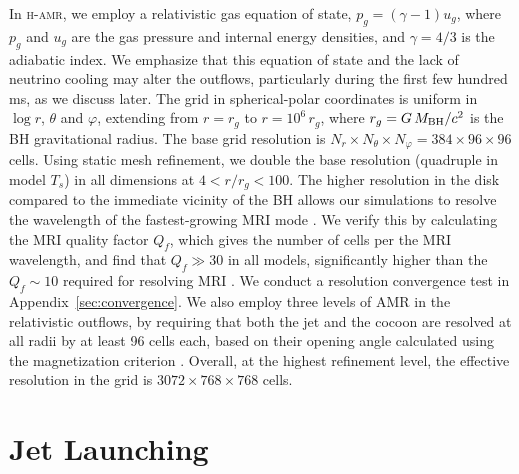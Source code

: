 \documentclass[twocolumn,dvipsnames]{aastex62}
\newcommand{\mbh}{\,{M_{\rm BH}}}
\begin{document}
In \textsc{h-amr}, we employ a relativistic gas equation of state, $p_g = (\gamma - 1) u_g$, where $p_g$ and $u_g$ are the gas pressure and internal energy densities, and $\gamma = 4/3$ is the adiabatic index. We emphasize that this equation of state and the lack of neutrino cooling may alter the outflows, particularly during the first few hundred ms, as we discuss later. The grid in spherical-polar coordinates is uniform in $\log r$, $\theta$ and $\varphi$, extending from $ r = r_g $ to $ r = 10^6\,r_g$, where $r_g=G\mbh/c^2$ is the BH gravitational radius. The base grid resolution is $N_r\times N_\theta\times N_\varphi = 384\times 96\times 96$ cells. Using static mesh refinement, we double the base resolution (quadruple in model $ T_s $) in all dimensions at $4 < r/r_g < 100 $. The higher resolution in the disk compared to the immediate vicinity of the BH allows our simulations to resolve the wavelength of the fastest-growing MRI mode \citep{Balbus1991}. We verify this by calculating the MRI quality factor $ Q_f $, which gives the number of cells per the MRI wavelength, and find that $ Q_f \gg 30 $ in all models, significantly higher than the $ Q_f \sim 10 $ required for resolving MRI \citep{Hawley2011}. We conduct a resolution convergence test in Appendix~\ref{sec:convergence}. We also employ three levels of AMR in the relativistic outflows, by requiring that both the jet and the cocoon are resolved at all radii by at least 96 cells each, based on their opening angle calculated using the magnetization criterion \citep[see details in][]{Gottlieb2022b}. Overall, at the highest refinement level, the effective resolution in the grid is $3072\times 768\times 768$ cells.
 
\section{Jet Launching}\label{sec:launching}
\end{document}
